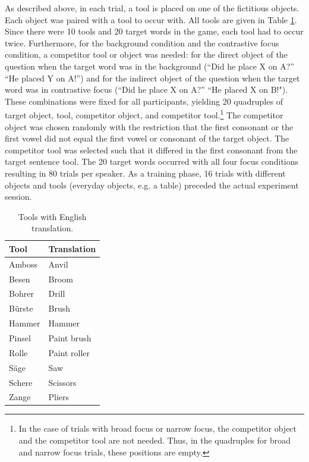As described above, in each trial, a tool is placed on one of the fictitious objects. Each object was paired with a tool to occur with. All tools are given in Table \ref{tab:tools}. Since there were 10 tools and 20 target words in the game, each tool had to occur twice. Furthermore, for the background condition and the contrastive focus condition, a competitor tool or object was needed: for the direct object of the question when the target word was in the background (``Did he place X on A?” “He placed Y on A!”) and for the indirect object of the question when the target word was in contrastive focus (``Did he place X on A?” “He placed X on B!"). These combinations were fixed for all participants, yielding 20 quadruples of target object, tool, competitor object, and competitor tool.\footnote{In the case of trials with broad focus or narrow focus, the competitor object and the competitor tool are not needed. Thus, in the quadruples for broad and narrow focus trials, these positions are empty.} The competitor object was chosen randomly with the restriction that the first consonant or the first vowel did not equal the first vowel or consonant of the target object. The competitor tool was selected such that it differed in the first consonant from the target sentence tool. The 20 target words occurred with all four focus conditions resulting in 80 trials per speaker. As a training phase, 16 trials with different objects and tools (everyday objects, e.g. a table) preceded the actual experiment session. 

\begin{table}[htp]
\caption{Tools with English translation.}
\begin{center}
\begin{tabular}{ll}
\textbf{Tool} & \textbf{Translation} \\
\hline
Amboss & Anvil \\
Besen & Broom \\
Bohrer & Drill \\
Bürste & Brush \\
Hammer & Hammer \\
Pinsel & Paint brush \\ 
Rolle & Paint roller \\ 
Säge & Saw \\
Schere & Scissors \\
Zange & Pliers
\end{tabular}
\end{center}
\label{tab:tools}
\end{table}

